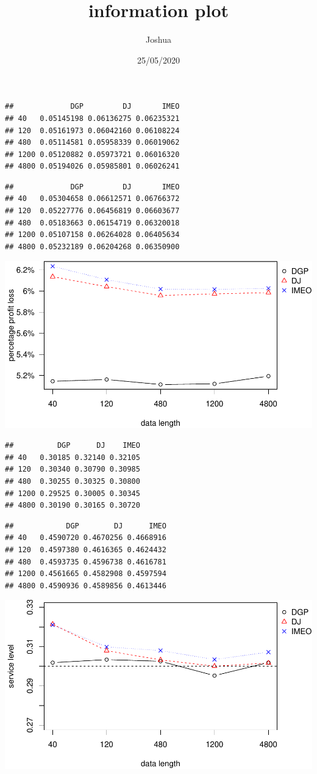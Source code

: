 \documentclass[
]{article}
\title{information plot}
\author{Joshua}
\date{25/05/2020}
\begin{document}
\maketitle

\begin{verbatim}
##             DGP         DJ       IMEO
## 40   0.05145198 0.06136275 0.06235321
## 120  0.05161973 0.06042160 0.06108224
## 480  0.05114581 0.05958339 0.06019062
## 1200 0.05120882 0.05973721 0.06016320
## 4800 0.05194026 0.05985801 0.06026241
\end{verbatim}

\begin{verbatim}
##             DGP         DJ       IMEO
## 40   0.05304658 0.06612571 0.06766372
## 120  0.05227776 0.06456819 0.06603677
## 480  0.05183663 0.06154719 0.06320018
## 1200 0.05107158 0.06264028 0.06405634
## 4800 0.05232189 0.06204268 0.06350900
\end{verbatim}

\includegraphics{information-plot_files/figure-latex/AR(1)ppl-1.pdf}

\begin{verbatim}
##          DGP      DJ    IMEO
## 40   0.30185 0.32140 0.32105
## 120  0.30340 0.30790 0.30985
## 480  0.30255 0.30325 0.30800
## 1200 0.29525 0.30005 0.30345
## 4800 0.30190 0.30165 0.30720
\end{verbatim}

\begin{verbatim}
##            DGP        DJ      IMEO
## 40   0.4590720 0.4670256 0.4668916
## 120  0.4597380 0.4616365 0.4624432
## 480  0.4593735 0.4596738 0.4616781
## 1200 0.4561665 0.4582908 0.4597594
## 4800 0.4590936 0.4589856 0.4613446
\end{verbatim}

\includegraphics{information-plot_files/figure-latex/AR(1)sl-1.pdf}
\end{document}

